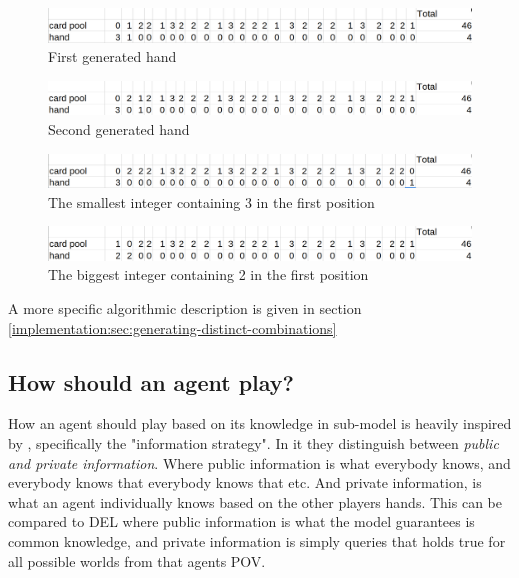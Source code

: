 \begin{figure}
	\centering
\includegraphics[width=13cm,frame]{images/biggest_integer.png}
	\caption{First generated hand}
	\label{fig:biggest-integer}
\end{figure}

\begin{figure}
	\centering
\includegraphics[width=13cm,frame]{images/next-biggest.png}
	\caption{Second generated hand}
	\label{fig:next-integer}
\end{figure}

\begin{figure}
	\centering
\includegraphics[width=13cm,frame]{images/etc_one.png}
	\caption{The smallest integer containing 3 in the first position}
	\label{fig:etc-one}
\end{figure}


\begin{figure}
	\centering
\includegraphics[width=13cm,frame]{images/decrement.png}
	\caption{The biggest integer containing 2 in the first position}
	\label{fig:decrement}
\end{figure}


A more specific algorithmic description is given in section \ref{implementation:sec:generating-distinct-combinations}

\subsection{How should an agent play?} \label{sec:how-should-an-agent-play}

How an agent should play based on its knowledge in sub-\KTfourfiveN model is heavily inspired by \cite{CoxEtAl2015}, specifically the "information strategy". 
In it they distinguish between \emph{public and private information}. Where public information is what everybody knows, and everybody knows that everybody knows that etc. And private information, is what an agent individually knows based on the other players hands. This can be compared to DEL where public information is what the model guarantees is common knowledge, and private information is simply queries that holds true for all possible worlds from that agents POV.


